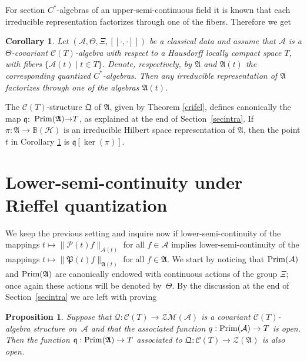 \documentclass[pdftex]{sigma}
\def\A{{\mathcal A}}
\def\Th{\Theta}
\def\QQ{\mathfrak Q}
\def\AA{\mathfrak A}
\def\C{\mathcal{C}}
\def\Q{\mathcal Q}
\def\P{\mathcal P}
\def\PP{{\mathfrak P}}
\newtheorem{Corollary}[Theorem]{Corollary}
\newtheorem{Proposition}[Theorem]{Proposition}
{\theoremstyle{definition}
\newtheorem{Definition}[Theorem]{Definition}
\newtheorem{Example}[Theorem]{Example}
\newtheorem{Remark}[Theorem]{Remark}
}
\begin{document}
For section $C^*$-algebras of an upper-semi-continuous f\/ield it is known \cite{Wi} that each irreducible representation
factorizes through one of the f\/ibers. Therefore we get

\begin{Corollary}\label{factor}
Let $(\A,\Th,\Xi,[\![\cdot,\cdot]\!])$ be a classical data and assume that $\A$ is a
$\Th$-covariant $\C(T)$-algebra with respect to a
Hausdorff locally compact space $T$, with fibers $\{\A(t)\mid t\in T\}$. Denote, respectively, by $\AA$ and $\AA(t)$
the corresponding quantized $C^*$-algebras. Then any irreducible representation of $\AA$ factorizes through
one of the algebras $\AA(t)$.
\end{Corollary}

The $\C(T)$-structure $\QQ$ of $\AA$, given by Theorem \ref{crifel}, def\/ines canonically the map
$\mathfrak q{:}\!$ ${\rm Prim}(\AA){\rightarrow} T$, as explained at the end of Section~\ref{secintra}.
If $\pi:\AA\rightarrow\mathbb B(\mathcal H)$ is an irreducible Hilbert space representation of $\AA$, then
the point $t$ in Corollary \ref{factor} is $\mathfrak q[\ker(\pi)]$.

\section{Lower-semi-continuity under Rief\/fel quantization}\label{joasa}

We keep the previous setting and inquire now if lower-semi-continuity of the mappings
$t\mapsto\| \P(t)f\|_{\A(t)}$ for all $f\in\A$ implies lower-semi-continuity of the mappings
$t\mapsto\| \PP(t)f\|_{\AA(t)}$ for all $f\in\AA$. We start by noticing that
${\rm Prim}(\A)$ and ${\rm Prim}(\AA)$
are canonically endowed with continuous actions of the group $\Xi$; once again these actions will be denoted by~$\Th$.
By the discussion at the end of Section~\ref{secintra} we are left with proving

\begin{Proposition}\label{segund}
Suppose that $\Q:\C(T)\to \mathcal Z\mathcal M(\A)$ is a covariant $\C(T)$-algebra structure on~$\A$ and that the associated function
$q:{\rm Prim}(\A)\to T$ is open. Then the function $\mathfrak q:{\rm Prim}(\AA)\to T$ associated to
$\mathfrak Q:\C(T)\to \mathcal Z(\AA)$ is also open.
\end{Proposition}
\end{document}
